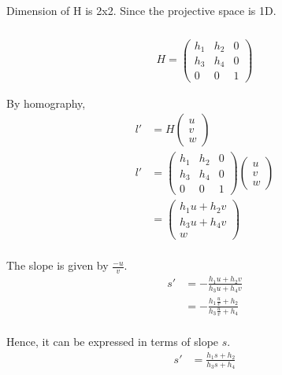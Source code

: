 \documentclass{article}
\begin{document}
\subsubsection{}
Dimension of H is 2x2. Since the projective space is 1D.

\subsubsection{}
\begin{align*}
H = \begin{pmatrix}
h_1 & h_2 & 0 \\
h_3 & h_4 & 0 \\
0 & 0 & 1
\end{pmatrix}
\end{align*}

By homography,
\begin{align*}
l' &= H \begin{pmatrix} u \\ v \\ w \end{pmatrix} \\
l' &= \begin{pmatrix} h_1 & h_2 & 0 \\ h_3 & h_4 & 0 \\ 0 & 0 & 1 \end{pmatrix} \begin{pmatrix} u \\ v \\ w \end{pmatrix} \\
&= \begin{pmatrix} h_1 u + h_2 v \\ h_3 u + h_4 v \\ w \end{pmatrix} \\
\end{align*}

The slope is given by $\frac{-u}{v}$. \\
\begin{align*}
s' &= - \frac{h_1 u + h_2 v}{h_3 u + h_4 v} \\
&= - \frac{h_1 \frac{u}{v} + h_2 }{h_3 \frac{u}{v} + h_4 } \\
\end{align*}

Hence, it can be expressed in terms of slope $s$.
\begin{align*}
s' &=  \frac{h_1 s + h_2 }{h_3 s + h_4 } \\
\end{align*}
\end{document}

